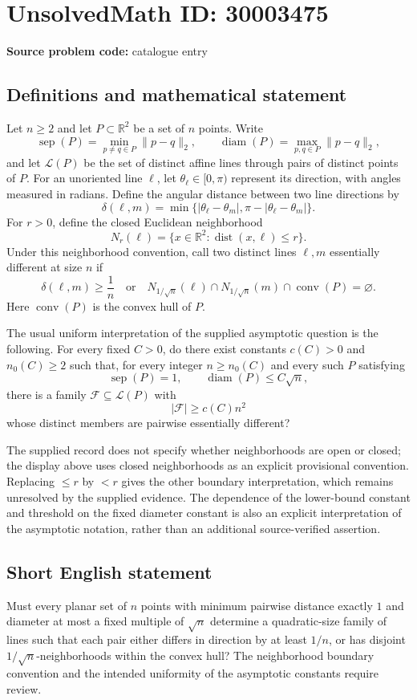 \documentclass[11pt]{article}
\newcommand{\R}{\mathbb{R}}
\begin{document}
\section*{UnsolvedMath ID: 30003475}
\textbf{Source problem code:} catalogue entry
\subsection{Definitions and mathematical statement}
Let \(n\ge 2\) and let \(P\subset\R^2\) be a set of \(n\) points. Write
\[
\operatorname{sep}(P)=\min_{p\ne q\in P}\|p-q\|_2,
\qquad
\operatorname{diam}(P)=\max_{p,q\in P}\|p-q\|_2,
\]
and let \(\mathcal L(P)\) be the set of distinct affine lines through pairs of distinct points of \(P\). For an unoriented line \(\ell\), let \(\theta_\ell\in[0,\pi)\) represent its direction, with angles measured in radians. Define the angular distance between two line directions by
\[
\delta(\ell,m)=\min\{|\theta_\ell-\theta_m|,\pi-|\theta_\ell-\theta_m|\}.
\]
For \(r>0\), define the closed Euclidean neighborhood
\[
N_r(\ell)=\{x\in\R^2:\operatorname{dist}(x,\ell)\le r\}.
\]
Under this neighborhood convention, call two distinct lines \(\ell,m\) essentially different at size \(n\) if
\[
\delta(\ell,m)\ge \frac1n
\quad\text{or}\quad
N_{1/\sqrt n}(\ell)\cap N_{1/\sqrt n}(m)\cap\operatorname{conv}(P)=\varnothing.
\]
Here \(\operatorname{conv}(P)\) is the convex hull of \(P\).

The usual uniform interpretation of the supplied asymptotic question is the following. For every fixed \(C>0\), do there exist constants \(c(C)>0\) and \(n_0(C)\ge2\) such that, for every integer \(n\ge n_0(C)\) and every such \(P\) satisfying
\[
\operatorname{sep}(P)=1,
\qquad
\operatorname{diam}(P)\le C\sqrt n,
\]
there is a family \(\mathcal F\subseteq\mathcal L(P)\) with
\[
|\mathcal F|\ge c(C)n^2
\]
whose distinct members are pairwise essentially different?

The supplied record does not specify whether neighborhoods are open or closed; the display above uses closed neighborhoods as an explicit provisional convention. Replacing \(\le r\) by \(<r\) gives the other boundary interpretation, which remains unresolved by the supplied evidence. The dependence of the lower-bound constant and threshold on the fixed diameter constant is also an explicit interpretation of the asymptotic notation, rather than an additional source-verified assertion.
\subsection{Short English statement}
Must every planar set of \(n\) points with minimum pairwise distance exactly \(1\) and diameter at most a fixed multiple of \(\sqrt n\) determine a quadratic-size family of lines such that each pair either differs in direction by at least \(1/n\), or has disjoint \(1/\sqrt n\)-neighborhoods within the convex hull? The neighborhood boundary convention and the intended uniformity of the asymptotic constants require review.
\end{document}
